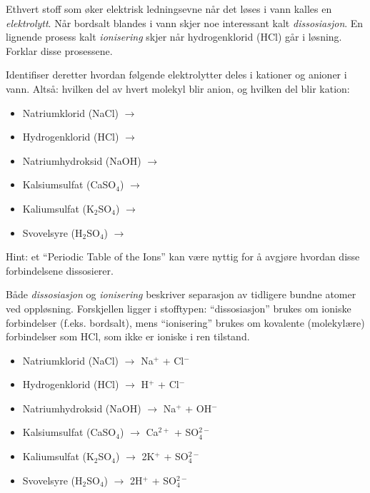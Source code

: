 

Ethvert stoff som øker elektrisk ledningsevne når det løses i vann kalles en {\it elektrolytt}. Når bordsalt blandes i vann skjer noe interessant kalt {\it dissosiasjon}. En lignende prosess kalt {\it ionisering} skjer når hydrogenklorid (HCl) går i løsning. Forklar disse prosessene.

Identifiser deretter hvordan følgende elektrolytter deles i kationer og anioner i vann. Altså: hvilken del av hvert molekyl blir anion, og hvilken del blir kation:

\begin{itemize}
\item{} Natriumklorid (NaCl) $\to$
\vskip 5pt
\item{} Hydrogenklorid (HCl) $\to$
\vskip 5pt
\item{} Natriumhydroksid (NaOH) $\to$
\vskip 5pt
\item{} Kalsiumsulfat (CaSO$_{4}$) $\to$
\vskip 5pt
\item{} Kaliumsulfat (K$_{2}$SO$_{4}$) $\to$
\vskip 5pt
\item{} Svovelsyre (H$_{2}$SO$_{4}$) $\to$
\end{itemize}

\vskip 10pt

Hint: et ``Periodic Table of the Ions'' kan være nyttig for å avgjøre hvordan disse forbindelsene dissosierer.







Både {\it dissosiasjon} og {\it ionisering} beskriver separasjon av tidligere bundne atomer ved oppløsning. Forskjellen ligger i stofftypen: ``dissosiasjon'' brukes om ioniske forbindelser (f.eks. bordsalt), mens ``ionisering'' brukes om kovalente (molekylære) forbindelser som HCl, som ikke er ioniske i ren tilstand.

\begin{itemize}
\item{} Natriumklorid (NaCl) $\to$ Na$^{+}$ + Cl$^{-}$
\vskip 5pt
\item{} Hydrogenklorid (HCl) $\to$ H$^{+}$ + Cl$^{-}$
\vskip 5pt
\item{} Natriumhydroksid (NaOH) $\to$ Na$^{+}$ + OH$^{-}$
\vskip 5pt
\item{} Kalsiumsulfat (CaSO$_{4}$) $\to$ Ca$^{2+}$ + SO$_{4}^{2-}$
\vskip 5pt
\item{} Kaliumsulfat (K$_{2}$SO$_{4}$) $\to$ 2K$^{+}$ + SO$_{4}^{2-}$
\vskip 5pt
\item{} Svovelsyre (H$_{2}$SO$_{4}$) $\to$ 2H$^{+}$ + SO$_{4}^{2-}$
\end{itemize}

